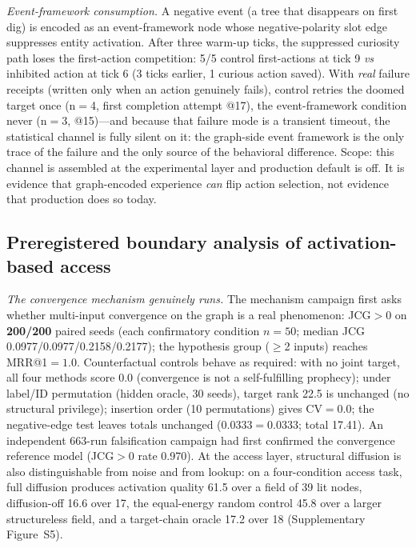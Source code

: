 \documentclass[10pt,a4paper]{article}
\begin{document}
\emph{Event-framework consumption.} A negative event (a tree that disappears on first dig) is encoded as an event-framework node whose negative-polarity slot edge suppresses entity activation. After three warm-up ticks, the suppressed curiosity path loses the first-action competition: 5/5 control first-actions at tick 9 \emph{vs} inhibited action at tick 6 (3 ticks earlier, 1 curious action saved). With \emph{real} failure receipts (written only when an action genuinely fails), control retries the doomed target once (n$=$4, first completion attempt @17), the event-framework condition never (n$=$3, @15)---and because that failure mode is a transient timeout, the statistical channel is fully silent on it: the graph-side event framework is the only trace of the failure and the only source of the behavioral difference. Scope: this channel is assembled at the experimental layer and production default is off. It is evidence that graph-encoded experience \emph{can} flip action selection, not evidence that production does so today.

\subsection{Preregistered boundary analysis of activation-based access}
\label{sec:res-boundary}

\emph{The convergence mechanism genuinely runs.} The mechanism campaign first asks whether multi-input convergence on the graph is a real phenomenon: JCG${>}$0 on \textbf{200/200} paired seeds (each confirmatory condition $n{=}50$; median JCG 0.0977/0.0977/0.2158/0.2177); the hypothesis group ($\ge$2 inputs) reaches MRR@1${=}1.0$. Counterfactual controls behave as required: with no joint target, all four methods score 0.0 (convergence is not a self-fulfilling prophecy); under label/ID permutation (hidden oracle, 30 seeds), target rank 22.5 is unchanged (no structural privilege); insertion order (10 permutations) gives CV${=}0.0$; the negative-edge test leaves totals unchanged (0.0333${=}$0.0333; total 17.41). An independent 663-run falsification campaign had first confirmed the convergence reference model (JCG${>}0$ rate 0.970). At the access layer, structural diffusion is also distinguishable from noise and from lookup: on a four-condition access task, full diffusion produces activation quality 61.5 over a field of 39 lit nodes, diffusion-off 16.6 over 17, the equal-energy random control 45.8 over a larger structureless field, and a target-chain oracle 17.2 over 18 (Supplementary Figure~S5).
\end{document}
